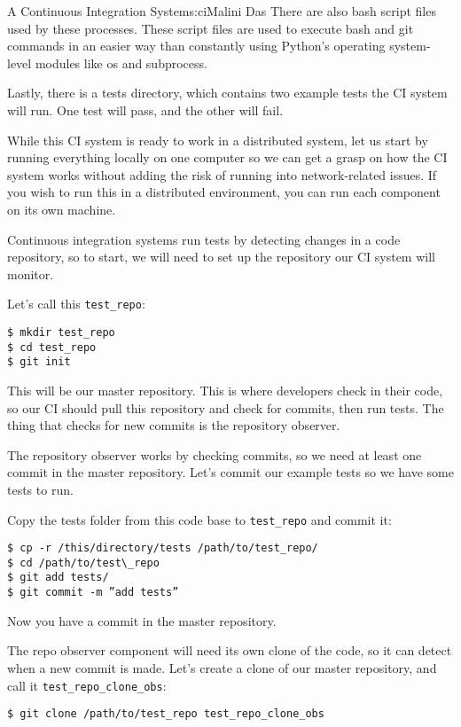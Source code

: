 \begin{aosachapter}{A Continuous Integration System}{s:ci}{Malini Das}
There are also bash script files used by these processes. These script
files are used to execute bash and git commands in an easier way than
constantly using Python's operating system-level modules like os and
subprocess.

Lastly, there is a tests directory, which contains two example tests the
CI system will run. One test will pass, and the other will fail.

\label{initial-setup}

While this CI system is ready to work in a distributed system, let us
start by running everything locally on one computer so we can get a
grasp on how the CI system works without adding the risk of running into
network-related issues. If you wish to run this in a distributed
environment, you can run each component on its own machine.

Continuous integration systems run tests by detecting changes in a code
repository, so to start, we will need to set up the repository our CI
system will monitor.

Let's call this \texttt{test\_repo}:

\begin{verbatim}
$ mkdir test_repo 
$ cd test_repo 
$ git init
\end{verbatim}

This will be our master repository. This is where developers check in
their code, so our CI should pull this repository and check for commits,
then run tests. The thing that checks for new commits is the repository
observer.

The repository observer works by checking commits, so we need at least
one commit in the master repository. Let's commit our example tests so
we have some tests to run.

Copy the tests folder from this code base to \texttt{test\_repo} and
commit it:

\begin{verbatim}
$ cp -r /this/directory/tests /path/to/test_repo/ 
$ cd /path/to/test\_repo 
$ git add tests/ 
$ git commit -m ”add tests”
\end{verbatim}

Now you have a commit in the master repository.

The repo observer component will need its own clone of the code, so it
can detect when a new commit is made. Let's create a clone of our master
repository, and call it \texttt{test\_repo\_clone\_obs}:

\begin{verbatim}
$ git clone /path/to/test_repo test_repo_clone_obs
\end{verbatim}


\end{aosachapter}
